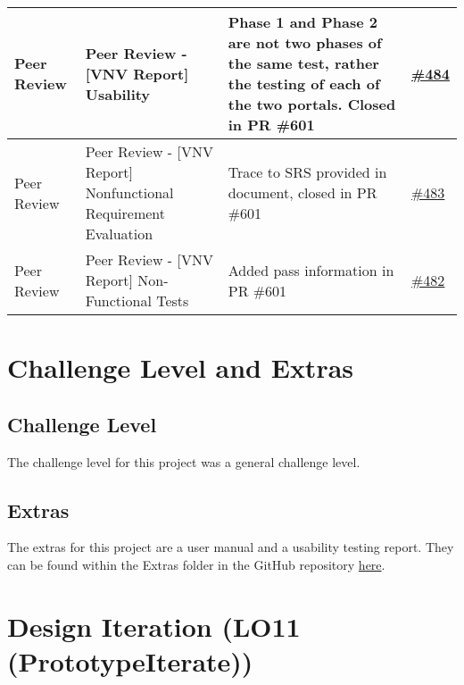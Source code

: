 \documentclass{article}
\begin{document}
\begin{longtable}{|m{3cm}|m{3cm}|m{5cm}|m{1cm}|}
  \hline
  Peer Review & Peer Review - [VNV Report] Usability & Phase 1 and Phase 2 are not two phases of the same test, 
  rather the testing of each of the two portals. Closed in PR \#601 & \href{https://github.com/Spitgranger/SyncMaster/pull/484}{\#484}\\
  \hline
  Peer Review & Peer Review - [VNV Report] Nonfunctional Requirement Evaluation & Trace to SRS provided in document,
  closed in PR \#601 & \href{https://github.com/Spitgranger/SyncMaster/pull/483}{\#483}\\
  \hline
  Peer Review & Peer Review - [VNV Report] Non-Functional Tests & Added pass information in PR \#601 & \href{https://github.com/Spitgranger/SyncMaster/pull/482}{\#482}\\
  \hline
  \end{longtable}
\section{Challenge Level and Extras}

\subsection{Challenge Level}

The challenge level for this project was a general challenge level.

\subsection{Extras}

The extras for this project are a user manual and a usability testing report.
They can be found within the Extras folder in the GitHub repository 
\href{https://github.com/Spitgranger/SyncMaster/tree/main/docs/Extras}{here}.

\section{Design Iteration (LO11 (PrototypeIterate))}
\end{document}
